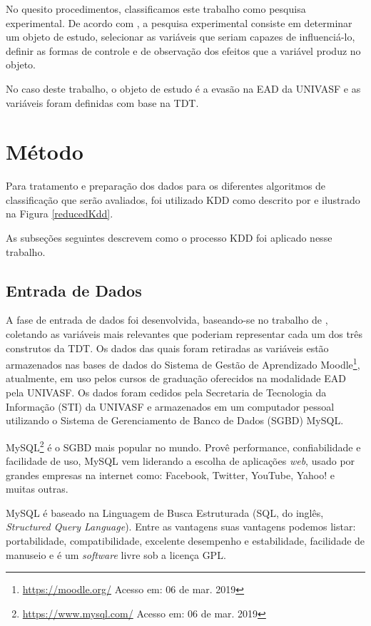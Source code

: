 No quesito procedimentos, classificamos este trabalho como pesquisa
experimental. De acordo com , a pesquisa
experimental consiste em determinar um objeto de estudo, selecionar as variáveis
que seriam capazes de influenciá-lo, definir as formas de controle e de
observação dos efeitos que a variável produz no objeto.

No caso deste trabalho, o objeto de estudo é a evasão na EAD da UNIVASF e as
variáveis foram definidas com base na TDT.

\section{Método}

Para tratamento e preparação dos dados para os diferentes algoritmos de
classificação que serão avaliados, foi utilizado KDD como descrito por
 e ilustrado na Figura \ref{reducedKdd}.


As subseções seguintes descrevem como o processo KDD foi aplicado nesse
trabalho.

\subsection{Entrada de Dados}

A fase de entrada de dados foi desenvolvida, baseando-se no trabalho de
, coletando as variáveis mais relevantes que
poderiam representar cada um dos três construtos da TDT. Os dados das quais
foram retiradas as variáveis estão armazenados nas bases de dados do Sistema de
Gestão de Aprendizado Moodle\footnote{\url{https://moodle.org/} Acesso em: 06 de
mar. 2019}, atualmente, em uso pelos cursos de graduação oferecidos na
modalidade EAD pela UNIVASF. Os dados foram cedidos pela Secretaria de
Tecnologia da Informação (STI) da UNIVASF e armazenados em um computador pessoal
utilizando o Sistema de Gerenciamento de Banco de Dados (SGBD) MySQL.

MySQL\footnote{\url{https://www.mysql.com/} Acesso em: 06 de mar. 2019} é o SGBD
mais popular no mundo. Provê performance, confiabilidade e facilidade de uso,
MySQL vem liderando a escolha de aplicações \textit{web}, usado por grandes
empresas na internet como: Facebook, Twitter, YouTube, Yahoo! e muitas outras.

MySQL é baseado na Linguagem de Busca Estruturada (SQL, do inglês,
\textit{Structured Query Language}). Entre as vantagens suas vantagens podemos
listar: portabilidade, compatibilidade, excelente desempenho e estabilidade,
facilidade de manuseio e é um \textit{software} livre sob a licença GPL.

